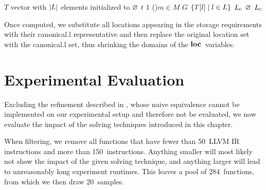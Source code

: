 \begin{algorithm}[t]
  {%
    $T$ \Assign vector with $\mCard{L}$ elements initialized to $\varnothing$\;
    $t$ \Assign $1$\;
    \For(){$m \in M$}{%
    }
    $G$ \Assign $\mSetBuilder{T[l]}{l \in L}$
    $L_{\textrm{\textsc{c}}}$ \Assign $\varnothing$\;
    \Return $L_{\textrm{\textsc{c}}}$\;
  }

  \caption[Algorithm for computing the set of canonical locations]%
          {%
            Computes the canonical locations from a given location set.
            If location restrictions for some data are already enforced by
            the function, then these are also tagged and processed accordingly%
          }
\end{algorithm}

Once computed, we substitute all locations appearing in the storage requirements
with their \gls{canonical.l} representative and then replace the original
\gls{location set} with the \gls{canonical.l} set, thus shrinking the
\glspl{domain} of the $\mVar{loc}$~\glspl{variable}.


\section{Experimental Evaluation}

Excluding the refinement described in
, whose naive equivalence
cannot be implemented on our experimental setup and therefore not be evaluated,
we now evaluate the impact of the solving techniques introduced in this chapter.

When filtering, we remove all \glspl{function} that have fewer than
\num{50}~\gls{LLVM} \gls{IR} \glspl{instruction} and more than
\num{150}~\glspl{instruction}.
%
Anything smaller will most likely not show the impact of the given solving
technique, and anything larger will lead to unreasonably long experiment
runtimes.
%
This leaves a pool of \num{284}~\glspl{function}, from which we then draw
\num{20}~samples.


